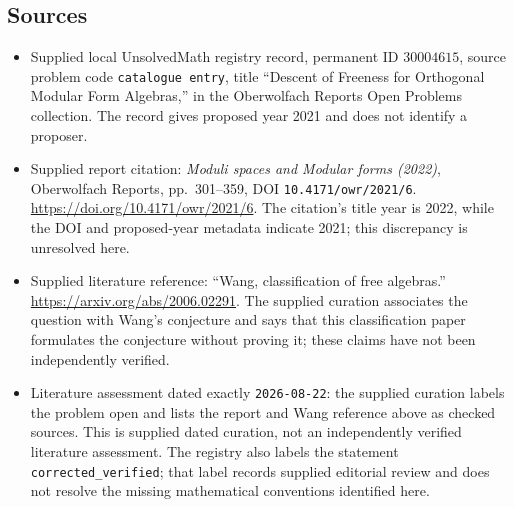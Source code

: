 \documentclass[11pt]{article}
\begin{document}
\subsection{Sources}
\begin{itemize}
\item Supplied local UnsolvedMath registry record, permanent ID \(30004615\), source problem code \texttt{catalogue entry}, title ``Descent of Freeness for Orthogonal Modular Form Algebras,'' in the Oberwolfach Reports Open Problems collection. The record gives proposed year 2021 and does not identify a proposer.
\item Supplied report citation: \emph{Moduli spaces and Modular forms (2022)}, Oberwolfach Reports, pp.\ 301--359, DOI \texttt{10.4171/owr/2021/6}. \url{https://doi.org/10.4171/owr/2021/6}. The citation's title year is 2022, while the DOI and proposed-year metadata indicate 2021; this discrepancy is unresolved here.
\item Supplied literature reference: ``Wang, classification of free algebras.'' \url{https://arxiv.org/abs/2006.02291}. The supplied curation associates the question with Wang's conjecture and says that this classification paper formulates the conjecture without proving it; these claims have not been independently verified.
\item Literature assessment dated exactly \texttt{2026-08-22}: the supplied curation labels the problem open and lists the report and Wang reference above as checked sources. This is supplied dated curation, not an independently verified literature assessment. The registry also labels the statement \texttt{corrected\_verified}; that label records supplied editorial review and does not resolve the missing mathematical conventions identified here.
\end{itemize}
\end{document}
